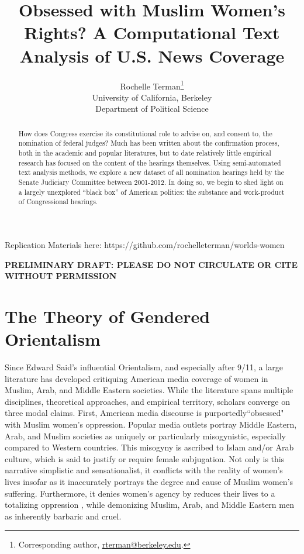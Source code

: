 \documentclass[11pt, oneside]{article}
\title{Obsessed with Muslim Women's Rights? A Computational Text Analysis of U.S. News Coverage}
\author{Rochelle Terman\thanks{Corresponding author, \url{rterman@berkeley.edu}. } \\University of California, Berkeley\\Department of Political Science}
\begin{document}
\maketitle
{}\baselineskip

\setcounter{page}{0}

\maketitle\thispagestyle{empty}

Replication Materials here: https://github.com/rochelleterman/worlds-women

\begin{center}
\textbf{PRELIMINARY DRAFT: PLEASE DO NOT CIRCULATE OR CITE WITHOUT PERMISSION}
\end{center}

\begin{abstract}
\noindent How does Congress exercise its constitutional role to advise on, and consent to, the nomination of federal judges? Much has been written about the confirmation process, both in the academic and popular literatures, but to date relatively little empirical research has focused on the content of the hearings themselves. Using semi-automated text analysis methods, we explore a new dataset of all nomination hearings held by the Senate Judiciary Committee between 2001-2012. In doing so, we begin to shed light on a largely unexplored ``black box'' of American politics: the substance and work-product of Congressional hearings.
\end{abstract}

\newpage\doublespace

\section{The Theory of Gendered Orientalism}

Since Edward Said's influential Orientalism, and especially after 9/11, a large literature has developed critiquing American media coverage of women in Muslim, Arab, and Middle Eastern societies. While the literature spans multiple disciplines, theoretical approaches, and empirical territory, scholars converge on three modal claims. First, American media discourse is purportedly``obsessed" with Muslim women's oppression. Popular media outlets portray Middle Eastern, Arab, and Muslim societies as uniquely or particularly misogynistic, especially compared to Western countries. This misogyny is ascribed to Islam and/or Arab culture, which is said to justify or require female subjugation. Not only is this narrative simplistic and sensationalist, it conflicts with the reality of women's lives insofar as it inaccurately portrays the degree and cause of Muslim women's suffering. Furthermore, it denies women's agency by reduces their lives to a totalizing oppression , while demonizing Muslim, Arab, and Middle Eastern men as inherently barbaric and cruel. 
\end{document}
